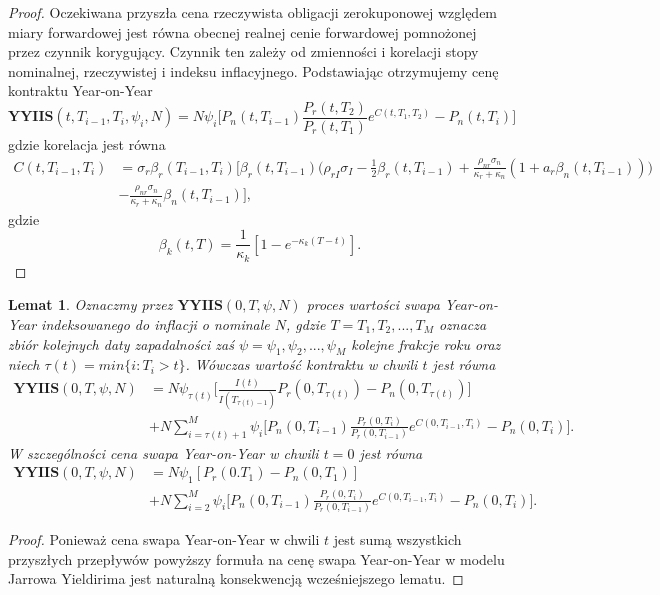 \documentclass{mini}
\theoremstyle{mythstyle}
\newtheorem{Lemat}{Lemat}[chapter]
\begin{document}
\begin{proof}
	Oczekiwana przyszła cena rzeczywista obligacji zerokuponowej względem miary forwardowej jest równa obecnej realnej cenie forwardowej pomnożonej przez czynnik korygujący. Czynnik ten zależy od zmienności i korelacji stopy nominalnej, rzeczywistej i indeksu inflacyjnego. Podstawiając otrzymujemy cenę kontraktu Year-on-Year
	\begin{equation*}
	\textbf{YYIIS}(t, T_{i-1},T_i,\psi_i,N) = N \psi_i \bigg[ P_n(t,T_{i-1}) \frac{P_r(t,T_2)}{P_r(t,T_1)} e^{C(t,T_1,T_2)} - P_n(t,T_i) \bigg]
	\end{equation*}
	gdzie korelacja jest równa
	\begin{align*}
	C(t,T_{i-1},T_i) &= \sigma_r\beta_r(T_{i-1},T_i) \bigg[ \beta_r(t,T_{i-1}) \bigg( \rho_{rI}\sigma_I - \frac{1}{2} \beta_r (t,T_{i-1}) 
	+ \frac{\rho_{nr}\sigma_n}{\kappa_r + \kappa_n} (1+a_r\beta_n(t,T_{i-1})) \bigg)\\&-  \frac{\rho_{nr}\sigma_n}{\kappa_r + \kappa_n} \beta_n(t,T_{i-1}) \bigg],
	\end{align*}
	gdzie
	\begin{equation*}
	\beta_k(t,T) = \frac{1}{\kappa_k} [1 - e^{-\kappa_k(T-t)}].
	\end{equation*}
	\end{proof}
\pagebreak
	\begin{Lemat}
	Oznaczmy przez $\textbf{YYIIS} (0,T,\psi,N)$ proces wartości swapa Year-on-Year indeksowanego do inflacji o nominale $N$, gdzie $T= {T_1,T_2,...,T_M}$ oznacza zbiór kolejnych  daty zapadalności zaś $\psi = {\psi_1,\psi_2,...,\psi_M}$ kolejne frakcje roku oraz niech $ \tau(t) = min\{i: T_i  > t\}$. Wówczas wartość kontraktu w chwili $t$ jest równa
		\begin{align*}
		\textbf{YYIIS} (0,T,\psi,N) &= N\psi_{\tau(t)}\bigg[\frac{I(t)}{I(T_{\tau(t)-1})}P_r(0,T_{\tau(t)}) - P_n(0,T_{\tau(t)})] \\
		&+ N\sum_{i=\tau(t)+1}^{M} \psi_i \bigg[ P_n(0,T_{i-1}) \frac{P_r(0,T_i)}{P_r(0,T_{i-1})}e^{C(0,T_{i-1},T_i)} - P_n(0,T_i) \bigg]. 
		\end{align*}
		W szczególności cena swapa Year-on-Year w chwili $t = 0$ jest równa
		\begin{align}
			\textbf{YYIIS} (0,T,\psi,N) &= N\psi_1[P_r(0.T_1) - P_n(0,T_1)] \\
			&+ N\sum_{i=2}^{M} \psi_i \bigg[ P_n(0,T_{i-1}) \frac{P_r(0,T_i)}{P_r(0,T_{i-1})}e^{C(0,T_{i-1},T_i)} - P_n(0,T_i) \bigg]. 
		\end{align}
	\end{Lemat}
\begin{proof}
		Ponieważ cena swapa Year-on-Year w chwili $t$ jest sumą wszystkich przyszłych przepływów powyższy formuła na cenę swapa Year-on-Year w modelu Jarrowa Yieldirima jest naturalną konsekwencją wcześniejszego lematu.
\end{proof}
\end{document}
